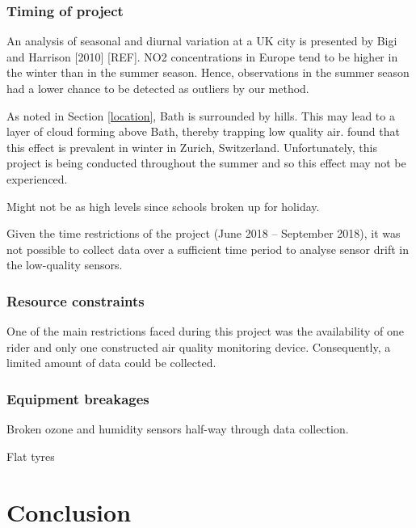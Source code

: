 \documentclass[11pt]{report}
\begin{document}
\subsection{Timing of project}

An analysis of seasonal and diurnal variation at a UK city is presented by Bigi and Harrison [2010] [REF]. NO2 concentrations in Europe tend to be higher in the winter than in the summer season. Hence, observations in the summer season had a lower chance to be detected as outliers by our method.

As noted in Section \ref{location}, Bath is surrounded by hills. This may lead to a layer of cloud forming above Bath, thereby trapping low quality air. \cite{Hasenfratz2015highresmapsTram} found that this effect is prevalent in winter in Zurich, Switzerland. Unfortunately, this project is being conducted throughout the summer and so this effect may not be experienced. 

Might not be as high levels since schools broken up for holiday.

Given the time restrictions of the project (June 2018 -- September 2018), it was not possible to collect data over a sufficient time period to analyse sensor drift in the low-quality sensors.

\subsection{Resource constraints}

One of the main restrictions faced during this project was the availability of one rider and only one constructed air quality monitoring device. Consequently, a limited amount of data could be collected.

\subsection{Equipment breakages}

Broken ozone and humidity sensors half-way through data collection.

Flat tyres




\chapter{Conclusion} \label{chap: conclusion}
\end{document}
